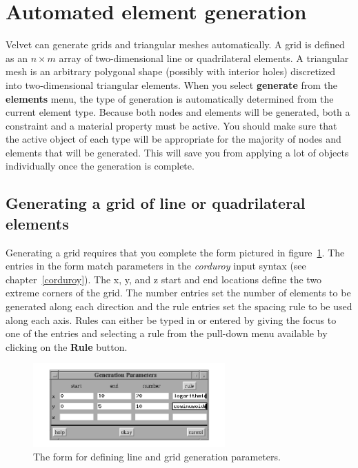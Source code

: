 \section{Automated element generation}

Velvet can generate grids and triangular meshes automatically.  A grid
is defined as an $n \times m$ array of two-dimensional line or quadrilateral
elements.  A
triangular mesh is an arbitrary polygonal shape (possibly with interior
holes) discretized into two-dimensional triangular elements.  When you
select {\bf generate} from the {\bf elements} menu, the type of
generation is automatically determined from the current element type.
Because
both nodes and elements will be generated, both a constraint and a
material property must be active.  You should make sure that the active
object of each type will be appropriate for the majority of nodes and
elements that will be generated.  This will save you from applying a lot of
objects individually once the generation is complete.

\subsection{Generating a grid of line or quadrilateral elements}

Generating a grid requires that you complete the form pictured in
figure~\ref{velvet.grid}.  The entries in the form match parameters
in the {\em corduroy} input syntax (see chapter~\ref{corduroy}).
The x, y, and z start and end locations define the two extreme
corners of the grid.  The number entries set the number of elements
to be generated along each direction and the rule entries set the
spacing rule to be used along each axis.  Rules can either be typed
in or entered by giving the focus to one of the entries and
selecting a rule from the pull-down menu available by clicking on
the {\bf Rule} button.
\begin{figure}
\begin{center}
 \includegraphics[width=2.9in]{figures/velvet_grid}
\end{center}
\caption{The form for defining line and grid generation parameters.}
\label{velvet.grid}
\end{figure}


